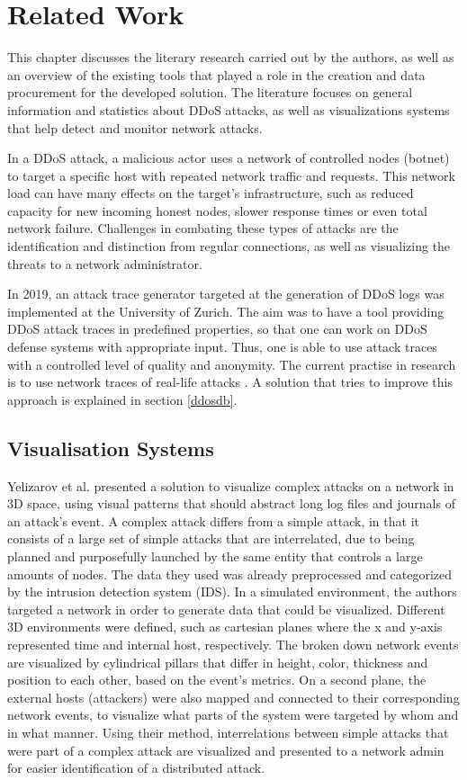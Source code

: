 \chapter{Related Work}
This chapter discusses the literary research carried out by the authors, as well as an overview of the existing tools that played a role in the creation and data procurement for the developed solution. The literature focuses on general information and statistics about DDoS attacks, as well as visualizations systems that help detect and monitor network attacks.

In a DDoS attack, a malicious actor uses a network of controlled nodes (botnet) to target a specific host with repeated network traffic and requests. This network load can have many effects on the target's infrastructure, such as reduced capacity for new incoming honest nodes, slower response times or even total network failure. Challenges in combating these types of attacks are the identification and distinction from regular connections, as well as visualizing the threats to a network administrator.

In 2019, an attack trace generator targeted at the generation of DDoS logs was implemented at the University of Zurich. The aim was to have a tool providing DDoS attack traces in predefined properties, so that one can work on DDoS defense systems with appropriate input. Thus, one is able to use attack traces with a controlled level of quality and anonymity. The current practise in research is to use network traces of real-life attacks \cite{ddoslogsim}. A solution that tries to improve this approach is explained in section \ref{ddosdb}.

\section{Visualisation Systems}
Yelizarov et al.\cite{yelizarov} presented a solution to visualize complex attacks on a network in 3D space, using visual patterns that should abstract long log files and journals of an attack's event. A complex attack differs from a simple attack, in that it consists of a large set of simple attacks that are interrelated, due to being planned and purposefully launched by the same entity that controls a large amounts of nodes. The data they used was already preprocessed and categorized by the intrusion detection system (IDS). In a simulated environment, the authors targeted a network in order to generate data that could be visualized. Different 3D environments were defined, such as cartesian planes where the x and y-axis represented time and internal host, respectively. The broken down network events are visualized by cylindrical pillars that differ in height, color, thickness and position to each other, based on the event's metrics. On a second plane, the external hosts (attackers) were also mapped and connected to their corresponding network events, to visualize what parts of the system were targeted by whom and in what manner. Using their method, interrelations between simple attacks that were part of a complex attack are visualized and presented to a network admin for easier identification of a distributed attack.

